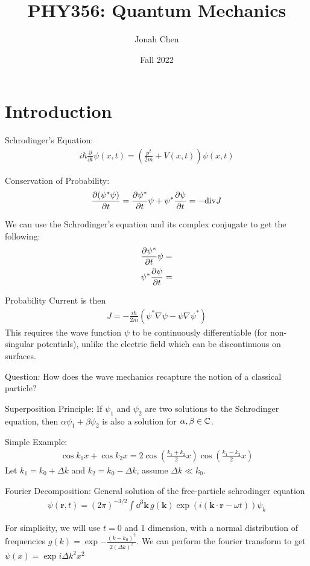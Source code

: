 \documentclass[12pt]{article}
\title{PHY356: Quantum Mechanics}
\author{Jonah Chen}
\date{Fall 2022}
\begin{document}
\maketitle
\sffamily
\section{Introduction}
Schrodinger's Equation:
\begin{align}
    i\hbar\frac{\partial}{\partial t}\psi(x, t) = \left(\frac{p^2}{2m}+V(x,t)\right)\psi(x, t)
\end{align}

Conservation of Probability:
\begin{align}
    \partialderivative{(\psi^*\psi)}{t} = \partialderivative{\psi^*}{t}\psi+\psi^*\partialderivative{\psi}{t} = -\mathrm{div} J
\end{align}

We can use the Schrodinger's equation and its complex conjugate to get the following:
\begin{align}
    \partialderivative{\psi^*}{t}\psi&=\\
    \psi^*\partialderivative{\psi}{t}&=
\end{align}

Probability Current is then 
\begin{align}
    J = -\frac{i\hbar}{2m}\left(\psi^*\nabla\psi-\psi\nabla\psi^*\right)
\end{align}
This requires the wave function $\psi$ to be continuously differentiable (for non-singular potentials), unlike the electric field which can be discontinuous on surfaces.

Question: How does the wave mechanics recapture the notion of a classical particle?

Superposition Principle: If $\psi_1$ and $\psi_2$ are two solutions to the Schrodinger equation, then $\alpha\psi_1+\beta\psi_2$ is also a solution for $\alpha, \beta\in\mathbb{C}$.

Simple Example:
\begin{align}
    \cos k_1x+\cos k_2x = 2\cos\left(\frac{k_1+k_2}{2}x\right)\cos\left(\frac{k_1-k_2}{2}x\right)
\end{align}
Let $k_1 = k_0+\Delta k$ and $k_2 = k_0-\Delta k$, assume $\Delta k\ll k_0$.

Fourier Decomposition:
General solution of the free-particle schrodinger equation
\begin{align}
    \psi(\mathbf r, t) = (2\pi)^{-3/2}\int \dd^3\mathbf k\, g(\mathbf k)\exp\left(i(\mathbf k\cdot\mathbf r-\omega t)\right)\psi_k
\end{align}

For simplicity, we will use $t=0$ and 1 dimension, with a normal distribution of frequencies $g(k)=\exp{-\frac{(k-k_0)^2}{2(\Delta k)^2}}$. We can perform the fourier transform to get $\psi(x)=\exp{i\Delta k^2 x^2}$
\end{document}
